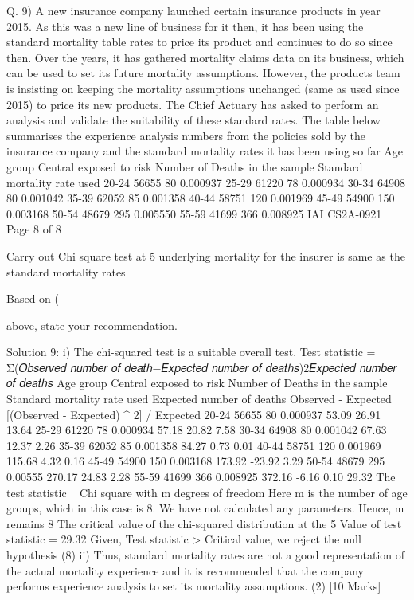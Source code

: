 Q. 9) A new insurance company launched certain insurance products in year 2015. As this was
a new line of business for it then, it has been using the standard mortality table rates to
price its product and continues to do so since then. Over the years, it has gathered mortality
claims data on its business, which can be used to set its future mortality assumptions.
However, the products team is insisting on keeping the mortality assumptions unchanged
(same as used since 2015) to price its new products. The Chief Actuary has asked to
perform an analysis and validate the suitability of these standard rates.
The table below summarises the experience analysis numbers from the policies sold by
the insurance company and the standard mortality rates it has been using so far
Age group Central exposed to
risk
Number of Deaths
in the sample
Standard mortality
rate used
20-24 56655 80 0.000937
25-29 61220 78 0.000934
30-34 64908 80 0.001042
35-39 62052 85 0.001358
40-44 58751 120 0.001969
45-49 54900 150 0.003168
50-54 48679 295 0.005550
55-59 41699 366 0.008925
IAI CS2A-0921
Page 8 of 8
\item Carry out Chi square test at 5%
underlying mortality for the insurer is same as the standard mortality rates

\item Based on (\item above, state your recommendation. 


Solution 9:
i)
The chi-squared test is a suitable overall test.
Test statistic = Σ(𝑂𝑏𝑠𝑒𝑟𝑣𝑒𝑑 𝑛𝑢𝑚𝑏𝑒𝑟 𝑜𝑓 𝑑𝑒𝑎𝑡ℎ−𝐸𝑥𝑝𝑒𝑐𝑡𝑒𝑑 𝑛𝑢𝑚𝑏𝑒𝑟 𝑜𝑓 𝑑𝑒𝑎𝑡ℎ𝑠)2𝐸𝑥𝑝𝑒𝑐𝑡𝑒𝑑 𝑛𝑢𝑚𝑏𝑒𝑟 𝑜𝑓 𝑑𝑒𝑎𝑡ℎ𝑠
Age group
Central exposed to risk
Number of Deaths in the sample
Standard mortality rate used
Expected number of deaths
Observed - Expected
[(Observed - Expected) ^ 2] / Expected
20-24
56655
80
0.000937
53.09
26.91
13.64
25-29
61220
78
0.000934
57.18
20.82
7.58
30-34
64908
80
0.001042
67.63
12.37
2.26
35-39
62052
85
0.001358
84.27
0.73
0.01
40-44
58751
120
0.001969
115.68
4.32
0.16
45-49
54900
150
0.003168
173.92
-23.92
3.29
50-54
48679
295
0.00555
270.17
24.83
2.28
55-59
41699
366
0.008925
372.16
-6.16
0.10
29.32
The test statistic ~ Chi square with m degrees of freedom
Here m is the number of age groups, which in this case is 8. We have not calculated any parameters. Hence, m remains 8
The critical value of the chi-squared distribution at the 5%
Value of test statistic = 29.32
Given, Test statistic > Critical value, we reject the null hypothesis
(8)
ii)
Thus, standard mortality rates are not a good representation of the actual mortality experience and it is recommended that the company performs experience analysis to set its mortality assumptions.
(2)
[10 Marks]
